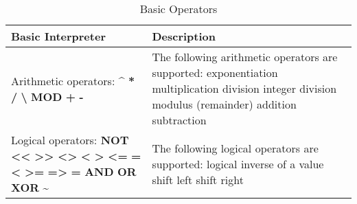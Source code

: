 \begin{table}[]
\centering
\caption{Basic Operators}
\label{Basic_Instructions_Operators}
\begin{tabular}{|p{4cm}|p{10cm}|}
\hline
\textbf{Basic Interpreter} & \textbf{Description}                                                     
\\ \hline
Arithmetic operators:\newline
\textbf{\^}\newline 
\textbf{*}\newline 
\textbf{/}\newline 
\textbf{\textbackslash}\newline
\textbf{MOD}\newline
\textbf{+}\newline
\textbf{-}
& 
The following arithmetic operators are supported:\newline
exponentiation\newline
multiplication\newline
division\newline
integer division\newline
modulus (remainder)\newline
addition\newline
subtraction\newline
\\ \hline
Logical operators:\newline
\textbf{NOT}\newline
\textbf{<<}\newline
\textbf{>>}\newline
\textbf{<>}\newline 
\textbf{<}\newline
\textbf{>}\newline
\textbf{<=}\newline
\textbf{=<}\newline
\textbf{>=}\newline
\textbf{=>}\newline
\textbf{=}\newline
\textbf{AND}\newline
\textbf{OR}\newline
\textbf{XOR}\newline
\textbf{\~}
& 
The following logical operators are supported:\newline
logical inverse of a value\newline
shift left\newline
shift right\newline

\end{tabular}
\end{table}
